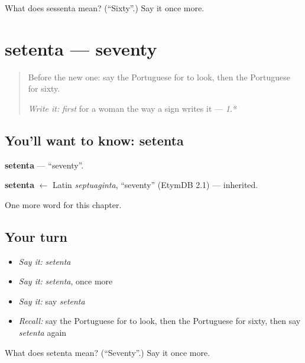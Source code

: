 \begin{tcolorbox}[breakable,colback=teal!4,colframe=teal!35!black,title={Before you move on}]
What does sessenta mean? (\textquotedblleft{}Sixty\textquotedblright{}.) Say it once more.
\end{tcolorbox}
\section[setenta]{setenta — seventy}

\label{lesson:PT-C130-setenta}



\begin{quote}
Before the new one: say the Portuguese for to look, then the Portuguese for sixty.

\emph{Write it:} \emph{first} for a woman the way a sign writes it — \emph{1.ª}
\end{quote}

\subsection*{You'll want to know: setenta}
\textbf{setenta} — \textquotedblleft{}seventy\textquotedblright{}.

\begin{cousinweb}
\textbf{setenta} $\leftarrow$ Latin \emph{septuaginta}, \textquotedblleft{}seventy\textquotedblright{} (EtymDB 2.1) — inherited.
\end{cousinweb}

\begin{grammarlens}[title={What you've built}]
One more word for this chapter.
\end{grammarlens}

\subsection*{Your turn}
\begin{itemize}
\raggedright
  \item \emph{Say it:} \emph{setenta}
  \item \emph{Say it:} \emph{setenta}, once more
  \item \emph{Say it:} say \emph{setenta}
  \item \emph{Recall:} say the Portuguese for to look, then the Portuguese for sixty, then say \emph{setenta} again
\end{itemize}

\begin{tcolorbox}[breakable,colback=teal!4,colframe=teal!35!black,title={Before you move on}]
What does setenta mean? (\textquotedblleft{}Seventy\textquotedblright{}.) Say it once more.
\end{tcolorbox}
